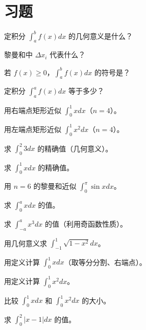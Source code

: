\section{习题}
\begin{exercise}[0] 定积分 \(\int_a^b f(x)dx\) 的几何意义是什么？\end{exercise}
\begin{exercise}[0] 黎曼和中 \(\Delta x_i\) 代表什么？\end{exercise}
\begin{exercise}[0] 若 \(f(x)\ge0\)，\(\int_a^b f(x)dx\) 的符号是？\end{exercise}
\begin{exercise}[0] 定积分 \(\int_a^a f(x)dx\) 等于多少？\end{exercise}
\begin{exercise}[1] 用右端点矩形近似 \(\int_0^1 x dx\)（\(n=4\)）。\end{exercise}
\begin{exercise}[1] 用左端点矩形近似 \(\int_0^1 x^2 dx\)（\(n=4\)）。\end{exercise}
\begin{exercise}[1] 求 \(\int_0^2 3 dx\) 的精确值（几何意义）。\end{exercise}
\begin{exercise}[1] 求 \(\int_0^1 x dx\) 的精确值。\end{exercise}
\begin{exercise}[2] 用 \(n=6\) 的黎曼和近似 \(\int_0^\pi \sin x dx\)。\end{exercise}
\begin{exercise}[2] 求 \(\int_0^a x dx\) 的值。\end{exercise}
\begin{exercise}[2] 求 \(\int_{-a}^a x^3 dx\) 的值（利用奇函数性质）。\end{exercise}
\begin{exercise}[2] 用几何意义求 \(\int_{-1}^1 \sqrt{1-x^2} dx\)。\end{exercise}
\begin{exercise}[3] 用定义计算 \(\int_0^1 x dx\)（取等分分割、右端点）。\end{exercise}
\begin{exercise}[3] 用定义计算 \(\int_0^1 x^2 dx\)。\end{exercise}
\begin{exercise}[3] 比较 \(\int_0^1 x dx\) 和 \(\int_0^1 x^2 dx\) 的大小。\end{exercise}
\begin{exercise}[3] 求 \(\int_0^2 |x-1| dx\) 的值。\end{exercise}
